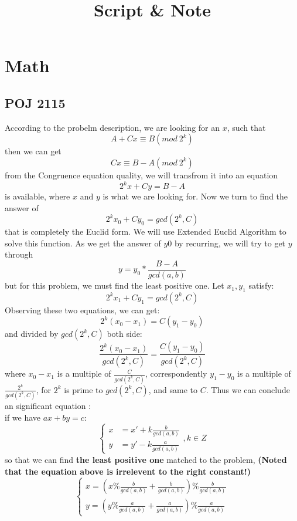 \documentclass{article}
\begin{document}
\LARGE
\title{Script & Note}
    \section{\Huge Math}
    \subsection{\LARGE POJ 2115}
    According to the probelm description, we are looking for an $x$, such that
    \[A + Cx \equiv B (mod\ 2^k)\]
    then we can get
    \[Cx \equiv B-A (mod\ 2^k)\]
    from the Congruence equation quality, we will transfrom it into an equation
    \[2^kx + Cy= B-A\]
    is available, where $x$ and $y$ is what we are looking for.
    Now we turn to find the answer of
    \[2^kx_0 + Cy_0= gcd(2^k,C)\]
    that is completely the Euclid form.
    We will use Extended Euclid Algorithm to solve this function.
    As we get the answer of $y0$ by recurring, we will try to get $y$ through
    \[y=y_0*\frac{B-A}{gcd(a,b)}\]
    but for this problem, we must find the least positive one.
    Let $x_1,y_1$ satisfy:
    \[2^kx_1 + Cy_1= gcd(2^k,C)\]
    Observing these two equations, we can get:
    \[2^k(x_0-x_1)=C(y_1-y_0)\]
    and divided by $gcd(2^k,C)$ both side:
    \[\frac{2^k(x_0-x_1)}{gcd(2^k,C)}=\frac{C(y_1-y_0)}{gcd(2^k,C)}\]
    where $x_0-x_1$ is a multiple of $\frac{C}{gcd(2^k,C)}$, correspondently $y_1-y_0$ is a multiple of $\frac{2^k}{gcd(2^k,C)}$, for $2^k$ is prime to $gcd(2^k,C)$, and same to $C$.
    Thus we can conclude an significant equation :\\
    if we have $ax+by=c:$
    \[
    \left\{
    \begin{aligned}
        x &= x' + k\frac{b}{gcd(a,b)}\\
        y &= y' - k\frac{a}{gcd(a,b)}
    \end{aligned}
    \right.
    ,k\in Z
    \]
    so that we can find \textbf{the least positive one} matched to the problem, \textbf{(Noted that the equation above is irrelevent to the right constant!)}
    \[
    \left\{
    \begin{aligned}
    x=(x\%\frac{b}{gcd(a,b)} + \frac{b}{gcd(a,b)})\%\frac{b}{gcd(a,b)}\\
    y=(y\%\frac{a}{gcd(a,b)} + \frac{a}{gcd(a,b)})\%\frac{a}{gcd(a,b)}
    \end{aligned}
    \right.
    \]
\end{document}
